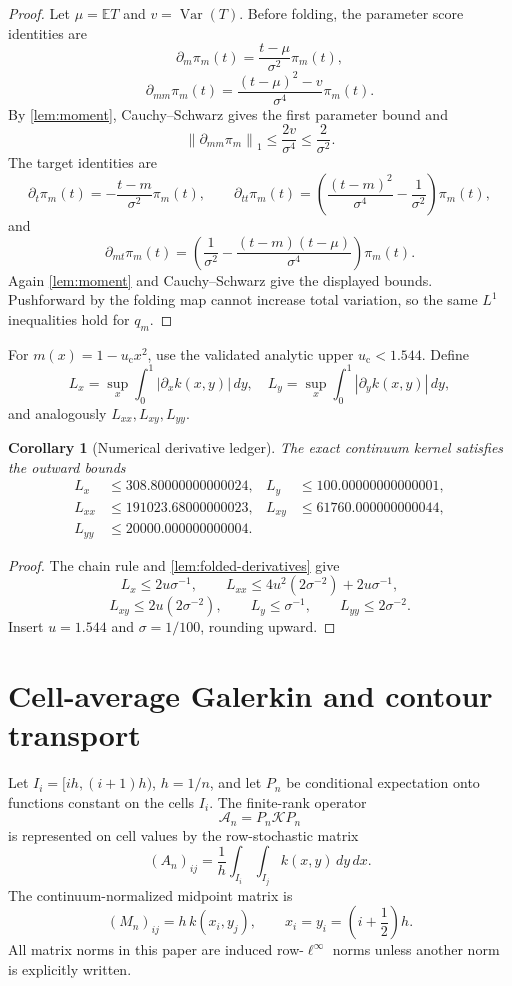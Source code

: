 \documentclass[11pt]{article}
\newtheorem{corollary}[theorem]{Corollary}
\theoremstyle{definition}
\theoremstyle{remark}
\newcommand{\cA}{\mathcal A}
\newcommand{\cK}{\mathcal K}
\newcommand{\uc}{u_{\mathrm c}}
\newcommand{\norm}[1]{\left\lVert #1\right\rVert}
\begin{document}
\begin{proof}
Let $\mu=\mathbb ET$ and $v=\operatorname{Var}(T)$.  Before folding, the
parameter score identities are
\[
 \partial_m\pi_m(t)=\frac{t-\mu}{\sigma^2}\pi_m(t),
\]
\[
 \partial_{mm}\pi_m(t)
 =\frac{(t-\mu)^2-v}{\sigma^4}\pi_m(t).
\]
By \cref{lem:moment}, Cauchy--Schwarz gives the first parameter bound and
\[
 \norm{\partial_{mm}\pi_m}_1
 \le\frac{2v}{\sigma^4}\le\frac2{\sigma^2}.
\]
The target identities are
\[
 \partial_t\pi_m(t)
 =-\frac{t-m}{\sigma^2}\pi_m(t),
\qquad
 \partial_{tt}\pi_m(t)
 =\left(\frac{(t-m)^2}{\sigma^4}-\frac1{\sigma^2}\right)\pi_m(t),
\]
and
\[
 \partial_{mt}\pi_m(t)
 =\left(
 \frac1{\sigma^2}
 -\frac{(t-m)(t-\mu)}{\sigma^4}
 \right)\pi_m(t).
\]
Again \cref{lem:moment} and Cauchy--Schwarz give the displayed bounds.
Pushforward by the folding map cannot increase total variation, so the same
$L^1$ inequalities hold for $q_m$.
\end{proof}

For $m(x)=1-\uc x^2$, use the validated analytic upper
$\uc<1.544$.  Define
\[
 L_x=\sup_x\int_0^1|\partial_xk(x,y)|\,dy,
 \quad
 L_y=\sup_x\int_0^1|\partial_yk(x,y)|\,dy,
\]
and analogously $L_{xx},L_{xy},L_{yy}$.

\begin{corollary}[Numerical derivative ledger]
\label{cor:derivative-ledger}
The exact continuum kernel satisfies the outward bounds
\begin{align*}
 L_x&\le308.80000000000024,
 &L_y&\le100.00000000000001,\\
 L_{xx}&\le191023.68000000023,
 &L_{xy}&\le61760.000000000044,\\
 L_{yy}&\le20000.000000000004.
\end{align*}
\end{corollary}

\begin{proof}
The chain rule and \cref{lem:folded-derivatives} give
\[
 L_x\le2u\sigma^{-1},\qquad
 L_{xx}\le4u^2(2\sigma^{-2})+2u\sigma^{-1},
\]
\[
 L_{xy}\le2u(2\sigma^{-2}),\qquad
 L_y\le\sigma^{-1},\qquad
 L_{yy}\le2\sigma^{-2}.
\]
Insert $u=1.544$ and $\sigma=1/100$, rounding upward.
\end{proof}

\section{Cell-average Galerkin and contour transport}
\label{sec:galerkin}

Let $I_i=[ih,(i+1)h)$, $h=1/n$, and let $P_n$ be conditional expectation
onto functions constant on the cells $I_i$.  The finite-rank operator
\[
 \cA_n=P_n\cK P_n
\]
is represented on cell values by the row-stochastic matrix
\begin{equation}
 (A_n)_{ij}
 =\frac1h\int_{I_i}\int_{I_j}k(x,y)\,dy\,dx.
 \label{eq:galerkin-matrix}
\end{equation}
The continuum-normalized midpoint matrix is
\begin{equation}
 (M_n)_{ij}=h\,k(x_i,y_j),
 \qquad
 x_i=y_i=\left(i+\frac12\right)h.
 \label{eq:midpoint-matrix}
\end{equation}
All matrix norms in this paper are induced row-$\ell^\infty$ norms unless
another norm is explicitly written.
\end{document}
